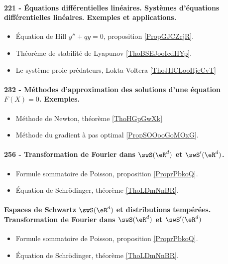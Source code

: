 \paragraph{221 - Équations différentielles linéaires. Systèmes d’équations différentielles linéaires. Exemples et applications.}
\begin{itemize}
    \item Équation de Hill \( y''+qy=0\), proposition \ref{PropGJCZcjR}.
    \item Théorème de stabilité de Lyapunov \ref{ThoBSEJooIcdHYp}.
    \item Le système proie prédateurs, Lokta-Voltera \ref{ThoJHCLooHjeCvT}
\end{itemize}
\paragraph{232 - Méthodes d'approximation des solutions d’une équation $F(X)=0$. Exemples.}
\begin{itemize}
    \item Méthode de Newton, théorème \ref{ThoHGpGwXk}
    \item Méthode du gradient à pas optimal \ref{PropSOOooGoMOxG}.
\end{itemize}
\paragraph{256 - Transformation de Fourier dans \( \swS(\eR^d)\) et \( \swS'(\eR^d)\).}
\begin{itemize}
    \item Formule sommatoire de Poisson, proposition \ref{ProprPbkoQ}.
    \item Équation de Schrödinger, théorème \ref{ThoLDmNnBR}.
\end{itemize}
\paragraph{Espaces de Schwartz \( \swS(\eR^d)\) et distributions tempérées. Transformation de Fourier dans \( \swS(\eR^d)\) et \( \swS'(\eR^d)\)}
\begin{itemize}
    \item Formule sommatoire de Poisson, proposition \ref{ProprPbkoQ}.
    \item Équation de Schrödinger, théorème \ref{ThoLDmNnBR}.
\end{itemize}
